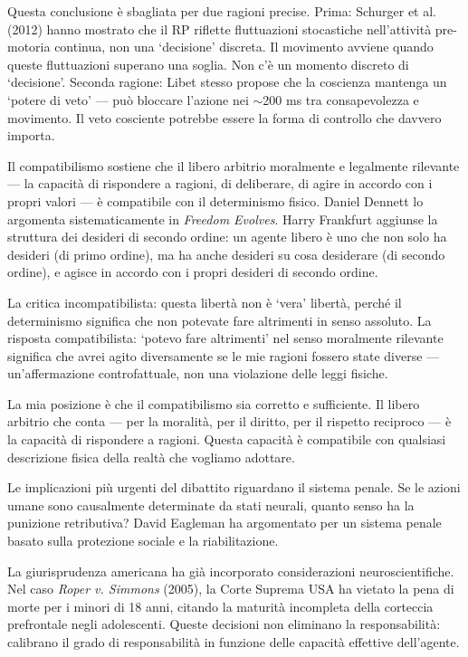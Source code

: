 \documentclass[12pt,a4paper,openany]{book}
\newcommand{\sezione}[1]{\vspace{1.2em}{\large\bfseries #1}\vspace{0.5em}\par}
\begin{document}
Questa conclusione è sbagliata per due ragioni precise. Prima: Schurger et al. (2012) hanno mostrato che il RP riflette fluttuazioni stocastiche nell'attività pre-motoria continua, non una `decisione' discreta. Il movimento avviene quando queste fluttuazioni superano una soglia. Non c'è un momento discreto di `decisione'. Seconda ragione: Libet stesso propose che la coscienza mantenga un `potere di veto' — può bloccare l'azione nei $\sim$200 ms tra consapevolezza e movimento. Il veto cosciente potrebbe essere la forma di controllo che davvero importa.

\sezione{Il compatibilismo}

Il compatibilismo sostiene che il libero arbitrio moralmente e legalmente rilevante — la capacità di rispondere a ragioni, di deliberare, di agire in accordo con i propri valori — è compatibile con il determinismo fisico. Daniel Dennett lo argomenta sistematicamente in \textit{Freedom Evolves}. Harry Frankfurt aggiunse la struttura dei desideri di secondo ordine: un agente libero è uno che non solo ha desideri (di primo ordine), ma ha anche desideri su cosa desiderare (di secondo ordine), e agisce in accordo con i propri desideri di secondo ordine.

La critica incompatibilista: questa libertà non è `vera' libertà, perché il determinismo significa che non potevate fare altrimenti in senso assoluto. La risposta compatibilista: `potevo fare altrimenti' nel senso moralmente rilevante significa che avrei agito diversamente se le mie ragioni fossero state diverse — un'affermazione controfattuale, non una violazione delle leggi fisiche.

La mia posizione è che il compatibilismo sia corretto e sufficiente. Il libero arbitrio che conta — per la moralità, per il diritto, per il rispetto reciproco — è la capacità di rispondere a ragioni. Questa capacità è compatibile con qualsiasi descrizione fisica della realtà che vogliamo adottare.

\sezione{Implicazioni per il diritto penale}

Le implicazioni più urgenti del dibattito riguardano il sistema penale. Se le azioni umane sono causalmente determinate da stati neurali, quanto senso ha la punizione retributiva? David Eagleman ha argomentato per un sistema penale basato sulla protezione sociale e la riabilitazione.

La giurisprudenza americana ha già incorporato considerazioni neuroscientifiche. Nel caso \textit{Roper v. Simmons} (2005), la Corte Suprema USA ha vietato la pena di morte per i minori di 18 anni, citando la maturità incompleta della corteccia prefrontale negli adolescenti. Queste decisioni non eliminano la responsabilità: calibrano il grado di responsabilità in funzione delle capacità effettive dell'agente.
\end{document}
